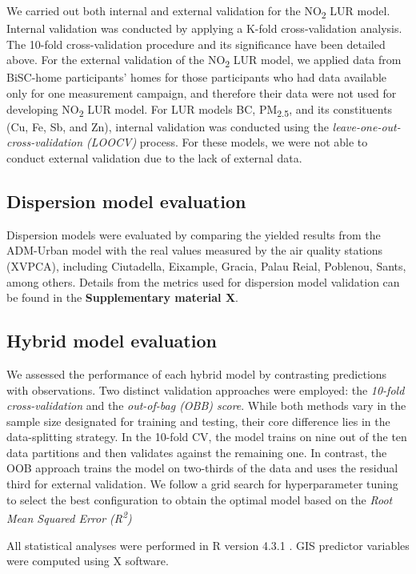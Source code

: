\documentclass{article}
\begin{document}
We carried out both internal and external validation for the NO\textsubscript{2} LUR model. Internal validation was conducted by applying a K-fold cross-validation analysis. The 10-fold cross-validation procedure and its significance have been detailed above. For the external validation of the NO\textsubscript{2} LUR model, we applied data from BiSC-home participants' homes for those participants who had data available only for one measurement campaign, and therefore their data were not used for developing NO\textsubscript{2} LUR model. For LUR models BC, PM\textsubscript{2.5}, and its constituents (Cu, Fe, Sb, and Zn), internal validation was conducted using the \textit{leave-one-out-cross-validation (LOOCV)} process. For these models, we were not able to conduct external validation due to the lack of external data.

\subsection{Dispersion model evaluation}
Dispersion models were evaluated by comparing the yielded results from the ADM-Urban model with the real values measured by the air quality stations (XVPCA), including Ciutadella, Eixample, Gracia, Palau Reial, Poblenou, Sants, among others. Details from the metrics used for dispersion model validation can be found in the \textbf{Supplementary material X}.\vspace{0.5cm} 

\subsection{Hybrid model evaluation}
We assessed the performance of each hybrid model by contrasting predictions with observations. Two distinct validation approaches were employed: the \textit{10-fold cross-validation} and the \textit{out-of-bag (OBB) score}. While both methods vary in the sample size designated for training and testing, their core difference lies in the data-splitting strategy. In the 10-fold CV, the model trains on nine out of the ten data partitions and then validates against the remaining one. In contrast, the OOB approach trains the model on two-thirds of the data and uses the residual third for external validation. We follow a grid search for hyperparameter tuning  to select the best configuration to obtain the optimal model based on the \textit{Root Mean Squared Error (R\textsuperscript{2})}

All statistical analyses were performed in R version 4.3.1 \cite{Rstudio}. GIS predictor variables were computed using X software. 
\end{document}
